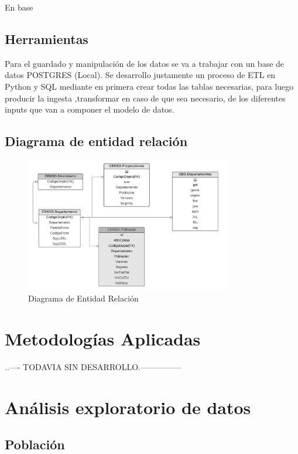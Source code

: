 \documentclass{article}
\theoremstyle{mytheoremstyle}
\theoremstyle{mytheoremstyle}
\theoremstyle{myproblemstyle}
\begin{document}
En base

\subsection{Herramientas }
Para el guardado y manipulación de los datos se va a trabajar con un base de datos POSTGRES (Local). 
Se desarrollo justamente un proceso de ETL en Python y SQL mediante en primera crear todas las tablas necesarias, 
para luego producir la ingesta ,transformar en caso de que sea necesario, de los diferentes inputs que van a componer el modelo de datos.	


\subsection{Diagrama de entidad relación }

\begin{figure}[htbp]
    \centering
    \includegraphics[width=0.8\textwidth]{img/DER.jpg}
    \caption{Diagrama de Entidad Relación}
  \label{fig:DER}
\end{figure}


\section{Metodologías Aplicadas}

..---- TODAVIA SIN DESARROLLO.---------------


\section{ Análisis exploratorio de datos}
\subsection{Población}
\end{document}
